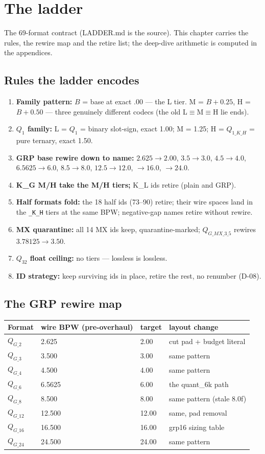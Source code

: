 \chapter{The ladder}

The 69-format contract (LADDER.md is the source). This chapter carries the rules, the rewire
map and the retire list; the deep-dive arithmetic is computed in the appendices.

\section{Rules the ladder encodes}

\begin{enumerate}
\item \textbf{Family pattern:} $B$ = base at exact $.00$ --- the L tier. M = $B+0.25$,
H = $B+0.50$ --- three genuinely different codecs (the old L$\equiv$M$\equiv$H lie ends).
\item \textbf{$Q_1$ family:} L = $Q_1$ = binary slot-sign, exact 1.00; M = 1.25;
H = $Q_{1\_K\_H}$ = pure ternary, exact 1.50.
\item \textbf{GRP base rewire down to name:} $2.625\to2.00$, $3.5\to3.0$, $4.5\to4.0$,
$6.5625\to6.0$, $8.5\to8.0$, $12.5\to12.0$, $\to16.0$, $\to24.0$.
\item \textbf{K\_G M/H take the M/H tiers;} K\_L ids retire (plain and GRP).
\item \textbf{Half formats fold:} the 18 half ids (73--90) retire; their wire spaces land in
the \texttt{\_K\_H} tiers at the same BPW; negative-gap names retire without rewire.
\item \textbf{MX quarantine:} all 14 MX ids keep, quarantine-marked;
$Q_{G\_MX\_3\_5}$ rewires $3.78125\to3.50$.
\item \textbf{$Q_{32}$ float ceiling:} no tiers --- lossless is lossless.
\item \textbf{ID strategy:} keep surviving ids in place, retire the rest, no renumber (D-08).
\end{enumerate}

\section{The GRP rewire map}

\begin{tabular}{@{}llll@{}}
\toprule
Format & wire BPW (pre-overhaul) & target & layout change\\
\midrule
$Q_{G\_2}$ & 2.625 & 2.00 & cut pad + budget literal\\
$Q_{G\_3}$ & 3.500 & 3.00 & same pattern\\
$Q_{G\_4}$ & 4.500 & 4.00 & same pattern\\
$Q_{G\_6}$ & 6.5625 & 6.00 & the quant\_6k path\\
$Q_{G\_8}$ & 8.500 & 8.00 & same pattern (stale 8.0f)\\
$Q_{G\_12}$ & 12.500 & 12.00 & same, pad removal\\
$Q_{G\_16}$ & 16.500 & 16.00 & grp16 sizing table\\
$Q_{G\_24}$ & 24.500 & 24.00 & same pattern\\
\bottomrule
\end{tabular}


